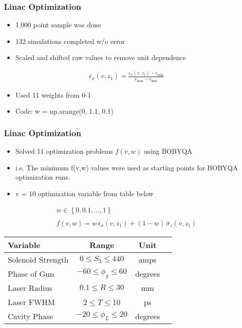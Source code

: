 \documentclass{beamer}
\begin{document}
\begin{frame}
	\frametitle{Linac Optimization}
	 \begin{itemize}
		  	\item{1,000 point sample was done}
		  	\item{132 simulations completed w/o error}
		  	\item{Scaled and shifted raw values to remove unit dependence}
	 \end{itemize}
	 \begin{align*}
	 \bar{\epsilon}_x (v,z_1) = \frac{ \epsilon_x (v,z_1) - \epsilon_{\min} } { \epsilon_{\max} - \epsilon_{\min} }
	 \end{align*}
	 
	 \begin{itemize}
	  	\item{Used 11 weights from 0-1}
	  	\item Code: w = np.arange(0, 1.1, 0.1)
	\end{itemize}
\end{frame}

\begin{frame}
	\frametitle{Linac Optimization}
	\begin{itemize}
		\item{Solved 11 optimization problems $f(v,w)$ using BOBYQA}
		\item i.e. The minimum f(v,w) values were used as starting points for BOBYQA optimization runs.
		\item v = 10 optimization variable from table below 
	\end{itemize}	
	\begin{gather*}
	w\in\left\{ 0, 0.1, \ldots, 1 \right\}\\ \\
	f(v,w) = w \,\bar{\epsilon}_x(v,z_1) + (1-w)\, \bar{\sigma}_z(v,z_1)
	\end{gather*}
	\begin{center}
		\setcounter{mpfootnote}{\value{footnote}}%
		\renewcommand{\thempfootnote}{\arabic{mpfootnote}}%
		\begin{tabular}{ l *{3}{c}}
			\textbf{Variable} & \textbf{Range} & \textbf{Unit} \\
			\midrule
			Solenoid Strength & $ 0 \le S_3 \le 440$  & amps \\
			Phase of Gun & $-60 \le \phi_g \le 60$  & degrees \\
			Laser Radius  & $0.1 \le R \le 30$  & mm \\
			Laser FWHM  & $2 \le T \le $10  & ps \\
			Cavity Phase & $-20 \le \phi_L \le 20$ & degrees
		\end{tabular}
	\end{center}
\end{frame}
\end{document}
